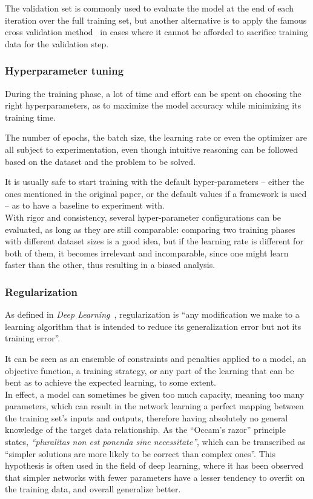 The validation set is commonly used to evaluate the model at the end of each
iteration over the full training set, but another alternative is to apply the
famous cross validation method~\cite{CrossVal} in cases where it cannot be
afforded to sacrifice training data for the validation step.

	\subsubsection{Hyperparameter tuning}

During the training phase, a lot of time and effort can be spent on choosing
the right hyperparameters, as to maximize the model accuracy while minimizing
its training time.

The number of epochs, the batch size, the learning rate or even the optimizer
are all subject to experimentation, even though intuitive reasoning can be
followed based on the dataset and the problem to be solved.

It is usually safe to start training with the default hyper-parameters -- either
the ones mentioned in the original paper, or the default values if a framework
is used -- as to have a baseline to experiment with.\\

With rigor and consistency, several hyper-parameter configurations can be
evaluated, as long as they are still comparable: comparing two training phases
with different dataset sizes is a good idea, but if the learning rate is
different for both of them, it becomes irrelevant and incomparable, since one
might learn faster than the other, thus resulting in a biased analysis.

	\subsubsection{Regularization}

As defined in \emph{Deep Learning}~\cite{Goodfellow-et-al-2016}, regularization
is ``any modification we make to a learning algorithm that is intended to
reduce its generalization error but not its training error''.

It can be seen as an ensemble of constraints and penalties applied to a model,
an objective function, a training strategy, or any part of the learning that
can be bent as to achieve the expected learning, to some extent.\\

In effect, a model can sometimes be given too much capacity, meaning too many
parameters, which can result in the network learning a perfect mapping between
the training set's inputs and outputs, therefore having absolutely no general
knowledge of the target data relationship. As the ``Occam's razor'' principle
states, \emph{``pluralitas non est ponenda sine necessitate''}, which can be
transcribed as ``simpler solutions are more likely to be correct than complex
ones''. This hypothesis is often used in the field of deep learning, where it
has been observed that simpler networks with fewer parameters have a lesser
tendency to overfit on the training data, and overall generalize better.\\

